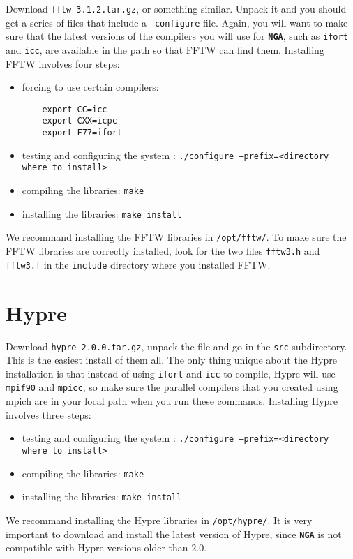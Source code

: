 \documentclass[10pt, oneside, onecolumn]{article}
\begin{document}
  Download {\tt fftw-3.1.2.tar.gz}, or something similar. Unpack it
  and you should get a series of files that include a {\tt
  configure} file. Again, you will want to make sure that the latest
  versions of the compilers you will use for {\tt\bf NGA}, such as
  {\tt ifort} and {\tt icc}, are available in the path so that FFTW
  can find them. Installing FFTW involves four steps: 
  \begin{itemize}
    \item forcing to use certain compilers:
      \begin{verbatim}
	export CC=icc
	export CXX=icpc
	export F77=ifort
      \end{verbatim}
    \item testing and configuring the system : {\tt ./configure
      --prefix=<directory where to install>}
    \item compiling the libraries: {\tt make}
    \item installing the libraries: {\tt make install}
  \end{itemize}
  We recommand installing the FFTW libraries in {\tt /opt/fftw/}. To
  make sure the FFTW libraries are correctly installed, look for the
  two files {\tt fftw3.h} and {\tt fftw3.f} in the {\tt include}
  directory where you installed FFTW.
  
  
  \section{Hypre}

  Download {\tt hypre-2.0.0.tar.gz}, unpack the file and go in the
  {\tt src} subdirectory. This is the easiest install of them all. The
  only thing unique about the Hypre installation is that instead of
  using {\tt ifort} and {\tt icc} to compile, Hypre will use {\tt
  mpif90} and {\tt mpicc}, so make sure the parallel compilers that
  you created using mpich are in your local path when you run these
  commands. Installing Hypre involves three steps:
  \begin{itemize}
    \item testing and configuring the system : {\tt ./configure
      --prefix=<directory where to install>}
    \item compiling the libraries: {\tt make}
    \item installing the libraries: {\tt make install}
  \end{itemize}
  We recommand installing the Hypre libraries in {\tt /opt/hypre/}. It
  is very important to download and install the latest version of
  Hypre, since {\tt\bf NGA} is not compatible with Hypre versions
  older than $2.0$.
\end{document}
